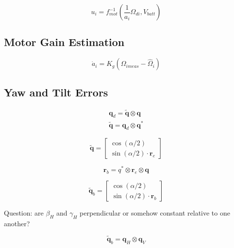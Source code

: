 \documentclass{article}
\numberwithin{equation}{section} %
\newcommand{\bs}[1]{\boldsymbol{#1}}
\begin{document}
\begin{equation}
u_i = f_{mot}^{-1} \left( \frac{1}{a_i} \Omega_{di}, V_{batt} \right)
\end{equation}

\subsection{Motor Gain Estimation}

\begin{equation}
\dot{a}_i = K_g \left( \Omega_{imeas} - \hat{\Omega}_i \right)
\end{equation}

\subsection{Yaw and Tilt Errors}

\begin{eqnarray}
\bs{q}_d = \tilde{\bs{q}} \otimes \bs{q} \\
\tilde{\bs{q}} = \bs{q}_d \otimes \bs{q}^*
\end{eqnarray}

\begin{equation}
\tilde{\bs{q}} = 
\begin{bmatrix}
	\cos \left( \alpha / 2 \right) \\
	\sin \left( \alpha / 2 \right) \cdot \bs{r}_e
\end{bmatrix}
\end{equation}

\begin{equation}
\bs{r}_b = q^* \otimes \bs{r}_e \otimes \bs{q}
\end{equation}

\begin{equation}
\tilde{\bs{q}}_b = 
\begin{bmatrix}
	\cos \left( \alpha / 2 \right) \\
	\sin \left( \alpha / 2 \right) \cdot \bs{r}_b
\end{bmatrix}
\end{equation}

Question: are $\beta_H$ and $\gamma_H$ perpendicular or somehow constant relative to one another?

\begin{equation}
\tilde{\bs{q}}_b = \bs{q}_H \otimes \bs{q}_V
\end{equation}
\end{document}
